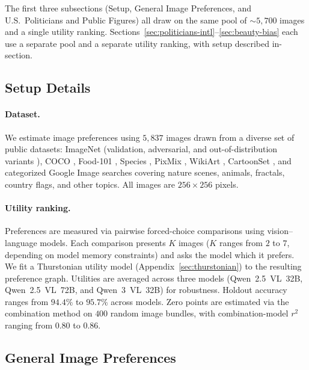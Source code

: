 The first three subsections (Setup, General Image Preferences, and U.S.\ Politicians and Public Figures) all draw on the same pool of ${\sim}5{,}700$ images and a single utility ranking. Sections~\ref{sec:politicians-intl}--\ref{sec:beauty-bias} each use a separate pool and a separate utility ranking, with setup described in-section.

\subsection{Setup Details}
\label{sec:image-pref-details}

\paragraph{Dataset.}
We estimate image preferences using $5{,}837$ images drawn from a diverse set of public datasets: ImageNet \citep{5206848} (validation, adversarial, and out-of-distribution variants \citep{hendrycks2021nae}), COCO \citep{lin2014coco}, Food-101 \citep{bossard14}, Species \citep{he2023species196}, PixMix \citep{hendrycks2022pixmixdreamlikepicturescomprehensively}, WikiArt \citep{wikiart}, CartoonSet \citep{googlecartoonset}, and categorized Google Image searches covering nature scenes, animals, fractals, country flags, and other topics.
All images are $256 \times 256$ pixels.

\paragraph{Utility ranking.}
Preferences are measured via pairwise forced-choice comparisons using vision--language models.
Each comparison presents $K$ images ($K$ ranges from $2$ to $7$, depending on model memory constraints) and asks the model which it prefers. We fit a Thurstonian utility model (Appendix~\ref{sec:thurstonian}) to the resulting preference graph.
Utilities are averaged across three models (Qwen~2.5~VL~32B, Qwen~2.5~VL~72B, and Qwen~3~VL~32B) for robustness. Holdout accuracy ranges from $94.4\%$ to $95.7\%$ across models. Zero points are estimated via the combination method on $400$ random image bundles, with combination-model $r^2$ ranging from $0.80$ to $0.86$.

\subsection{General Image Preferences}
\label{app:general-image-preferences}


